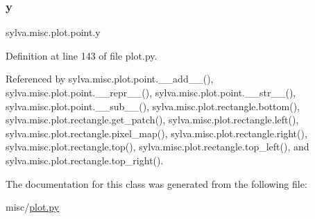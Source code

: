 \subsubsection{\texorpdfstring{y}{y}}
{\footnotesize\ttfamily sylva.\+misc.\+plot.\+point.\+y}



Definition at line 143 of file plot.\+py.



Referenced by sylva.\+misc.\+plot.\+point.\+\_\+\+\_\+add\+\_\+\+\_\+(), sylva.\+misc.\+plot.\+point.\+\_\+\+\_\+repr\+\_\+\+\_\+(), sylva.\+misc.\+plot.\+point.\+\_\+\+\_\+str\+\_\+\+\_\+(), sylva.\+misc.\+plot.\+point.\+\_\+\+\_\+sub\+\_\+\+\_\+(), sylva.\+misc.\+plot.\+rectangle.\+bottom(), sylva.\+misc.\+plot.\+rectangle.\+get\+\_\+patch(), sylva.\+misc.\+plot.\+rectangle.\+left(), sylva.\+misc.\+plot.\+rectangle.\+pixel\+\_\+map(), sylva.\+misc.\+plot.\+rectangle.\+right(), sylva.\+misc.\+plot.\+rectangle.\+top(), sylva.\+misc.\+plot.\+rectangle.\+top\+\_\+left(), and sylva.\+misc.\+plot.\+rectangle.\+top\+\_\+right().



The documentation for this class was generated from the following file\+:\begin{DoxyCompactItemize}
\item 
misc/\hyperlink{plot_8py}{plot.\+py}\end{DoxyCompactItemize}
